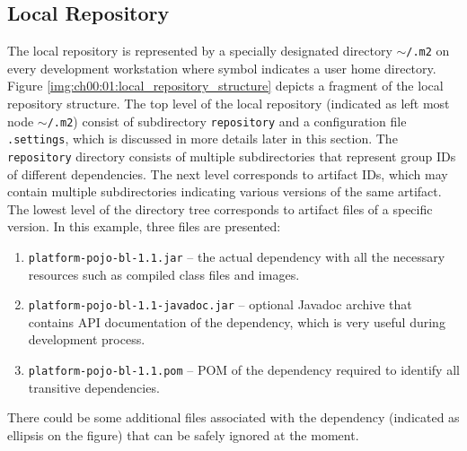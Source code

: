   \subsection*{Local Repository}
  The local repository is represented by a specially designated directory \texttt{$\sim$/.m2} on every development workstation where symbol \tikzinline{$\sim$} indicates a user home directory.
  Figure \ref{img:ch00:01:local_repository_structure} depicts a fragment of the local repository structure.
  The top level of the local repository (indicated as left most node \texttt{$\sim$/.m2}) consist of subdirectory \texttt{repository} and a configuration file \texttt{.settings}, which is discussed in more details later in this section.
  The \texttt{repository} directory consists of multiple subdirectories that represent group IDs of different dependencies.
  The next level corresponds to artifact IDs, which may contain multiple subdirectories indicating various versions of the same artifact.
  The lowest level of the directory tree corresponds to artifact files of a specific version.
  In this example, three files are presented:
  \begin{enumerate}
    \item \texttt{platform-pojo-bl-1.1.jar} -- the actual dependency with all the necessary resources such as compiled class files and images.
    \item \texttt{platform-pojo-bl-1.1-javadoc.jar} -- optional Javadoc archive that contains API documentation of the dependency, which is very useful during development process.
    \item \texttt{platform-pojo-bl-1.1.pom} -- POM of the dependency required to identify all transitive dependencies.
  \end{enumerate}
  There could be some additional files associated with the dependency (indicated as ellipsis on the figure) that can be safely ignored at the moment.

